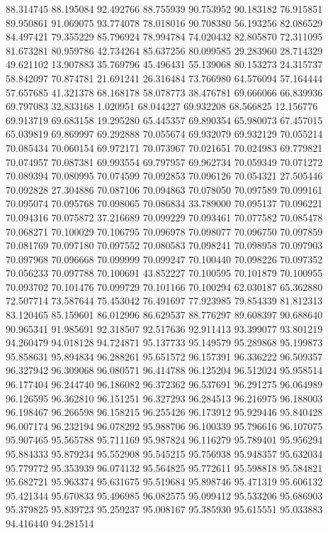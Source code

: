 88.314745
88.195084
92.492766
88.755939
90.753952
90.183182
76.915851
89.950861
91.069075
93.774078
78.018016
90.708380
56.193256
82.086529
84.497421
79.355229
85.796924
78.994784
74.020432
82.805870
72.311095
81.673281
80.959786
42.734264
85.637256
80.099585
29.283960
28.714329
49.621102
13.907883
35.769796
45.496431
55.139068
80.153273
24.315737
58.842097
70.874781
21.691241
26.316484
73.766980
64.576094
57.164444
57.657685
41.321378
68.168178
58.078773
38.476781
69.666066
66.839936
69.797083
32.833168
1.020951
68.044227
69.932208
68.566825
12.156776
69.913719
69.683158
19.295280
65.445357
69.890354
65.980073
67.457015
65.039819
69.869997
69.292888
70.055674
69.932079
69.932129
70.055214
70.085434
70.060154
69.972171
70.073967
70.021651
70.024983
69.779821
70.074957
70.087381
69.993554
69.797957
69.962734
70.059349
70.071272
70.089394
70.080995
70.074599
70.092853
70.096126
70.054321
27.505446
70.092828
27.304886
70.087106
70.094863
70.078050
70.097589
70.099161
70.095074
70.095768
70.098065
70.086834
33.789000
70.095137
70.096221
70.094316
70.075872
37.216689
70.099229
70.093461
70.077582
70.085478
70.068271
70.100029
70.106795
70.096978
70.098077
70.096750
70.097859
70.081769
70.097180
70.097552
70.080583
70.098241
70.098958
70.097903
70.097968
70.096668
70.099999
70.099247
70.100440
70.098226
70.097352
70.056233
70.097788
70.100691
43.852227
70.100595
70.101879
70.100955
70.093702
70.101476
70.099729
70.101166
70.100294
62.030187
65.362880
72.507714
73.587644
75.453042
76.491697
77.923985
79.854339
81.812313
83.120465
85.159601
86.012996
86.629537
88.776297
89.608397
90.688640
90.965341
91.985691
92.318507
92.517636
92.911413
93.399077
93.801219
94.260479
94.018128
94.724871
95.137733
95.149579
95.289868
95.199873
95.858631
95.894834
96.288261
95.651572
96.157391
96.336222
96.509357
96.327942
96.309068
96.080571
96.414788
96.125204
96.512024
95.958514
96.177404
96.244740
96.186082
96.372362
96.537691
96.291275
96.064989
96.126595
96.362810
96.151251
96.327293
96.284513
96.216975
96.188003
96.198467
96.266598
96.158215
96.255426
96.173912
95.929446
95.840428
96.007174
96.232194
96.078292
95.988706
96.100339
95.796616
96.107075
95.907465
95.565788
95.711169
95.987824
96.116279
95.789401
95.956294
95.884333
95.879234
95.552908
95.545215
95.756938
95.948357
95.632034
95.779772
95.353939
96.074132
95.564825
95.772611
95.598818
95.584821
95.682721
95.963374
95.631675
95.519684
95.898746
95.471319
95.606132
95.421344
95.670833
95.496985
96.082575
95.099412
95.533206
95.686903
95.379825
95.839723
95.259237
95.008167
95.385930
95.615551
95.033883
94.416440
94.281514
